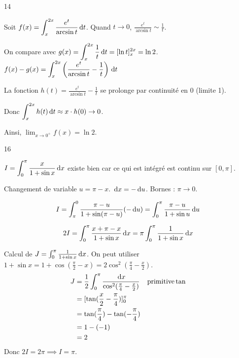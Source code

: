 \begin{correction}{14}

    Soit $\displaystyle f(x) = \int_x^{2x} \frac{e^t}{\arcsin t} \,\mathrm{d}t$.
    Quand $t \to 0$, $\frac{e^t}{\arcsin t} \sim \frac{1}{t}$.

    On compare avec $\displaystyle g(x) = \int_x^{2x} \frac{1}{t} \,\mathrm{d}t = [\ln t]_x^{2x} = \ln 2$.
    $\displaystyle f(x) - g(x) = \int_x^{2x} \left(\frac{e^t}{\arcsin t} - \frac{1}{t}\right) \,\mathrm{d}t$

    La fonction $h(t) = \frac{e^t}{\arcsin t} - \frac{1}{t}$ se prolonge par continuité en 0 (limite 1).
    
    Donc $\displaystyle \int_x^{2x} h(t) \,\mathrm{d} t \approx x \cdot h(0) \to 0$.

    Ainsi, $\lim_{x\to 0^+} f(x) = \ln 2$.
\end{correction}

\begin{correction}{16}

    $\displaystyle I = \int_0^\pi \frac{x}{1+\sin x} \,\mathrm{d}x$ existe bien car ce qui est intégré est continu sur $[0,\pi]$.

    Changement de variable $u = \pi - x$. $\,\mathrm{d}x = -\,\mathrm{d} u$.
    Bornes : $\pi \to 0$.
    
    $$I = \int_\pi^0 \frac{\pi-u}{1+\sin(\pi-u)} (-\,\mathrm{d} u) = \int_0^\pi \frac{\pi-u}{1+\sin u} \,\mathrm{d} u$$

    $$2I = \int_0^\pi \frac{x + \pi - x}{1+\sin x} \,\mathrm{d}x = \pi \int_0^\pi \frac{1}{1+\sin x} \,\mathrm{d}x$$

    Calcul de $J = \int_0^\pi \frac{1}{1+\sin x} \,\mathrm{d}x$.
    On peut utiliser $1+\sin x = 1 + \cos(\frac{\pi}{2}-x) = 2 \cos^2(\frac{\pi}{4}-\frac{x}{2})$.
    \begin{align*}
        J &= \frac{1}{2} \int_0^\pi \frac{\,\mathrm{d} x}{\cos^2(\frac{\pi}{4}-\frac{x}{2})} &\text{primitive} \tan \\
          &= [\tan(\frac{x}{2}-\frac{\pi}{4})]_0^\pi \\
          &= \tan(\frac{\pi}{4}) - \tan(-\frac{\pi}{4}) \\
          &= 1 - (-1) \\
          &= 2
    \end{align*}
    Donc $2I = 2\pi \implies I = \pi$.
\end{correction}

